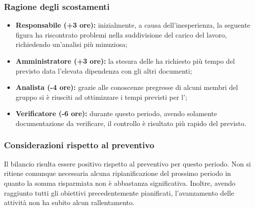 \subsubsection{Ragione degli scostamenti} \label{subsubsection:ragione_scostamenti}
\begin{itemize}
    \item \textbf{Responsabile (+3 ore):} inizialmente, a causa dell'inesperienza, la seguente figura ha riscontrato problemi nella suddivisione del carico del lavoro, richiedendo un'analisi più minuziosa;
    \item \textbf{Amministratore (+3 ore):} la stesura delle \docNameNdP ha richiesto più tempo del previsto data l'elevata dipendenza con gli altri documenti;
    \item \textbf{Analista (-4 ore):} grazie alle conoscenze pregresse di alcuni membri del gruppo si è riusciti ad ottimizzare i tempi previsti per l'\docNameAdR;
    \item \textbf{Verificatore (-6 ore):} durante questo periodo, avendo solamente documentazione da verificare, il controllo è risultato più rapido del previsto.
\end{itemize}

\subsubsection{Considerazioni rispetto al preventivo} \label{subsubsection:considerazioni_finali}
Il bilancio risulta essere positivo rispetto al preventivo per questo periodo. Non si ritiene comunque necessaria alcuna ripianificazione del prossimo periodo in quanto la somma risparmiata non è abbastanza significativa.
Inoltre, avendo raggiunto tutti gli obiettivi precedentemente pianificati, l'avanzamento delle attività non ha subito alcun rallentamento.
\pagebreak

